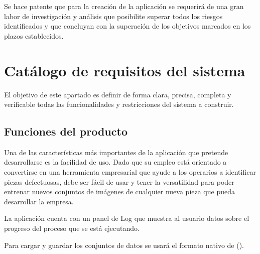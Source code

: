 Se hace patente que para la creación de la aplicación se requerirá de una gran labor de investigación y análisis que posibilite superar todos los riesgos identificados y que concluyan con la superación de los objetivos marcados en los plazos establecidos.
\newpage



\section{Catálogo de requisitos del sistema}
El objetivo de este apartado es definir de forma clara, precisa, completa y verificable todas las funcionalidades y restricciones del sistema a construir.



\subsection{Funciones del producto}
Una de las características más importantes de la aplicación que pretende desarrollarse es la facilidad de uso. Dado que su empleo está orientado a convertirse en una herramienta empresarial que ayude a los operarios a identificar piezas defectuosas, debe ser fácil de usar y tener la versatilidad para poder entrenar nuevos conjuntos de imágenes de cualquier nueva pieza que pueda desarrollar la empresa.

La aplicación cuenta con un panel de Log que muestra al usuario datos sobre el progreso del proceso que se está ejecutando.

Para cargar y guardar los conjuntos de datos se usará el formato nativo de \weka{} (\arff{}).


